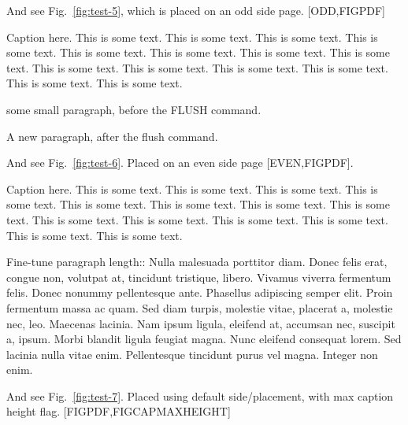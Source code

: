 \documentclass[12pt,a5paper]{book}
\begin{document}
\lipsum[5-7]


\cleardoublepage
\lipsum[1-3]

And see Fig.~\ref{fig:test-5}, which is placed on an odd side page. [ODD,FIGPDF]

\begin{fullpagefigure}
  \caption{Caption here. This is some text. This is some text. This is some text. This is
    some text. This is some text. This is some text. This is some text. This is some
    text. This is some text. This is some text. This is some text. This is some text. This
    is some text. This is some text. }
  \label{fig:test-5}
\end{fullpagefigure}

some small paragraph, before the FLUSH command.

\FlushAllFullPageFigures

A new paragraph, after the flush command.

\lipsum[5-7]


\cleardoublepage
\lipsum[1-3]

And see Fig.~\ref{fig:test-6}. Placed on an even side page [EVEN,FIGPDF].

\begin{fullpagefigure}
  \caption{Caption here. This is some text. This is some text. This is some text. This is
    some text. This is some text. This is some text. This is some text. This is some
    text. This is some text. This is some text. This is some text. This is some text. This
    is some text. This is some text. }
  \label{fig:test-6}
\end{fullpagefigure}

\lipsum[5-7]


\cleardoublepage
\lipsum[1-2]

Fine-tune paragraph length:: Nulla malesuada porttitor diam. Donec felis erat, congue non,
volutpat at, tincidunt tristique, libero. Vivamus viverra fermentum felis. Donec nonummy
pellentesque ante. Phasellus adipiscing semper elit. Proin fermentum massa ac quam. Sed
diam turpis, molestie vitae, placerat a, molestie nec, leo. Maecenas lacinia. Nam ipsum
ligula, eleifend at, accumsan nec, suscipit a, ipsum. Morbi blandit ligula feugiat
magna. Nunc eleifend consequat lorem. Sed lacinia nulla vitae enim. Pellentesque tincidunt
purus vel magna. Integer non enim.

And see Fig.~\ref{fig:test-7}. Placed using default side/placement, with max caption
height flag. [FIGPDF,FIGCAPMAXHEIGHT]
\end{document}
